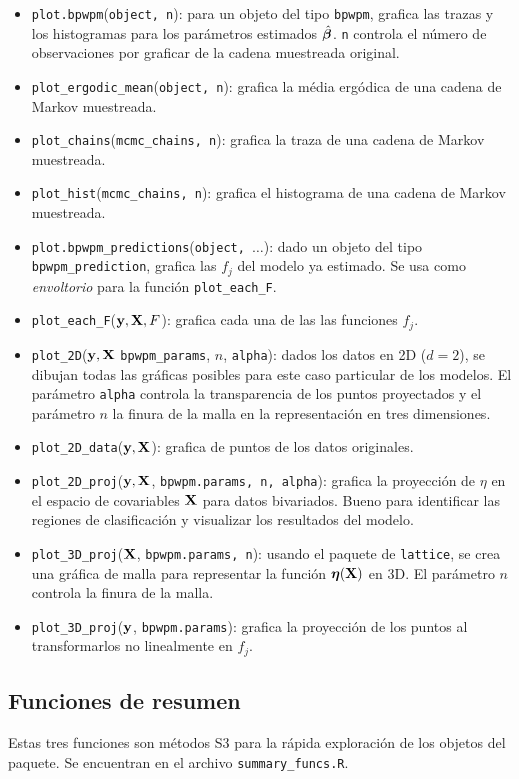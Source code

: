 \documentclass[../../Main/Main.tex]{subfiles}
\begin{document}
\begin{itemize}[label = {}]
	\item \verb|plot.bpwpm|(\verb|object, n|): para un objeto del tipo \verb|bpwpm|, grafica las trazas y los histogramas para los parámetros estimados $\hat{\bm{\beta}}$. \verb|n| controla el número de observaciones por graficar de la cadena muestreada original.
	\item \verb|plot_ergodic_mean|(\verb|object, n|): grafica la média ergódica de una cadena de Markov muestreada.
	\item \verb|plot_chains|(\verb|mcmc_chains, n|): grafica la traza de una cadena de Markov muestreada.
	\item \verb|plot_hist|(\verb|mcmc_chains, n|): grafica el histograma de una cadena de Markov muestreada.  
	\item \verb|plot.bpwpm_predictions|(\verb|object, |$\ldots$): dado un objeto del tipo \verb|bpwpm_prediction|, grafica las $f_j$ del modelo ya estimado. Se usa como \emph{envoltorio} para la función \verb|plot_each_F|. 
	\item \verb|plot_each_F|($\mathbf{y}, \mathbf{X}, F$): grafica cada una de las las funciones $f_j$. 
	\item \verb|plot_2D|($\mathbf{y},\mathbf{X}$ \verb|bpwpm_params|, $n$, \verb|alpha|): dados los datos en 2D ($d = 2$), se dibujan todas las gráficas posibles para este caso particular de los modelos. El parámetro \verb|alpha| controla la transparencia de los puntos proyectados y el parámetro $n$ la finura de la malla en la representación en tres dimensiones.
	\item \verb|plot_2D_data|($\mathbf{y}, \mathbf{X}$): grafica de puntos de los datos originales.
	\item \verb|plot_2D_proj|($\mathbf{y}, \mathbf{X}$, \verb|bpwpm.params, n, alpha|): grafica la proyección de $\eta$ en el espacio de covariables $\mathcal{\mathbf{X}}$ para datos bivariados. Bueno para identificar las regiones de clasificación y visualizar los resultados del modelo.
	\item \verb|plot_3D_proj|($\mathbf{X}$, \verb|bpwpm.params, n|): usando el paquete de \verb|lattice|, se crea una gráfica de malla para representar la función $\bm{\eta}(\mathbf{X})$ en 3D. El parámetro $n$ controla la finura de la malla.
	\item \verb|plot_3D_proj|($\mathbf{y}$, \verb|bpwpm.params|): grafica la proyección de los puntos al transformarlos no linealmente en $f_j$. 
\end{itemize}

\subsection*{Funciones de resumen}
Estas tres funciones son métodos S3 para la rápida exploración de los objetos del paquete. Se encuentran en el archivo \verb|summary_funcs.R|.
\end{document}
